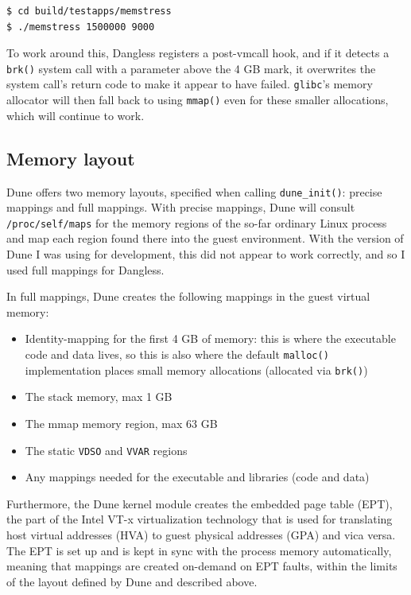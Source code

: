 \begin{verbatim}
$ cd build/testapps/memstress
$ ./memstress 1500000 9000
\end{verbatim}

To work around this, Dangless registers a post-vmcall hook, and if it detects a \lstinline!brk()! system call with a parameter above the 4 GB mark, it overwrites the system call's return code to make it appear to have failed. \texttt{glibc}'s memory allocator will then fall back to using \lstinline!mmap()! even for these smaller allocations, which will continue to work.

\subsection{Memory layout}

Dune offers two memory layouts, specified when calling \lstinline!dune_init()!: precise mappings and full mappings.
With precise mappings, Dune will consult \texttt{/proc/self/maps} for the memory regions of the so-far ordinary Linux process and map each region found there into the guest environment. With the version of Dune I was using for development, this did not appear to work correctly, and so I used full mappings for Dangless.

In full mappings, Dune creates the following mappings in the guest virtual memory:

\begin{itemize}
	\item Identity-mapping for the first 4 GB of memory: this is where the executable code and data lives, so this is also where the default \lstinline!malloc()! implementation places small memory allocations (allocated via \lstinline!brk()!)
	\item The stack memory, max 1 GB
	\item The mmap memory region, max 63 GB
	\item The static \texttt{VDSO} and \texttt{VVAR} regions
	\item Any mappings needed for the executable and libraries (code and data)
\end{itemize}

Furthermore, the Dune kernel module creates the embedded page table (EPT), the part of the Intel VT-x virtualization technology that is used for translating host virtual addresses (HVA) to guest physical addresses (GPA) and vica versa. The EPT is set up and is kept in sync with the process memory automatically, meaning that mappings are created on-demand on EPT faults, within the limits of the layout defined by Dune and described above.

